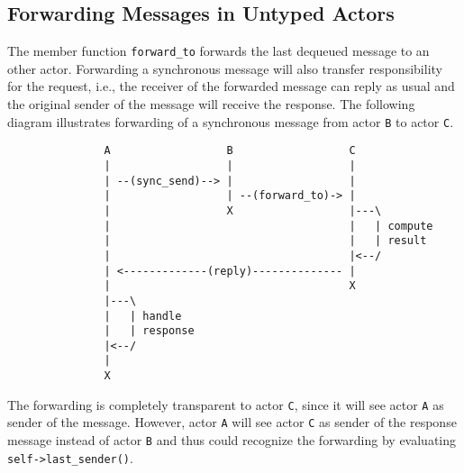 \clearpage
\subsection{Forwarding Messages in Untyped Actors}

The member function \lstinline^forward_to^ forwards the last dequeued message to an other actor.
Forwarding a synchronous message will also transfer responsibility for the request, i.e., the receiver of the forwarded message can reply as usual and the original sender of the message will receive the response.
The following diagram illustrates forwarding of a synchronous message from actor \texttt{B} to actor \texttt{C}.

\begin{footnotesize}
\begin{verbatim}
               A                  B                  C
               |                  |                  |
               | --(sync_send)--> |                  |
               |                  | --(forward_to)-> |
               |                  X                  |---\
               |                                     |   | compute
               |                                     |   | result
               |                                     |<--/
               | <-------------(reply)-------------- |
               |                                     X
               |---\
               |   | handle
               |   | response
               |<--/
               |
               X
\end{verbatim}
\end{footnotesize}

The forwarding is completely transparent to actor \texttt{C}, since it will see actor \texttt{A} as sender of the message.
However, actor \texttt{A} will see actor \texttt{C} as sender of the response message instead of actor \texttt{B} and thus could recognize the forwarding by evaluating \lstinline^self->last_sender()^.
